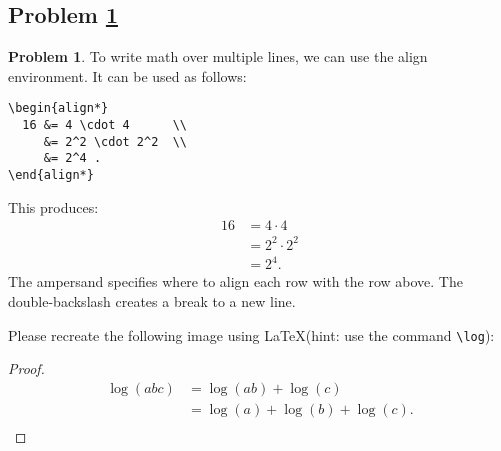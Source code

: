 \documentclass[11pt]{article}
\theoremstyle{definition}
\theoremstyle{definition}
\newtheorem{required}{Problem}
\theoremstyle{definition}
\begin{document}
\subsection{Problem \ref{Latex4}}
\begin{required} \label{Latex4}
To write math over multiple lines, we can use the align environment.
It can be used as follows:
\begin{verbatim}
\begin{align*}
  16 &= 4 \cdot 4      \\
     &= 2^2 \cdot 2^2  \\
     &= 2^4 .
\end{align*}
\end{verbatim}
This produces:
\begin{align*}
  16 &= 4 \cdot 4      \\
     &= 2^2 \cdot 2^2  \\
     &= 2^4 .
\end{align*}
The ampersand specifies where to align each row with the row above. The double-backslash creates a break to a new line.

Please recreate the following image using \LaTeX (hint: use the command \texttt{\textbackslash log}):

\begin{center}
\end{center}
\end{required}

\begin{proof}
\begin{align*}
\log{(abc)} &= \log{(ab)}+\log{(c)}		\\
		&= \log{(a)}+\log{(b)}+\log{(c)}.	\\
\end{align*}
\end{proof}



\end{document}

